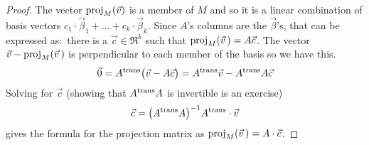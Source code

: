 \begin{proof}
The vector \( \proj{\vec{v}}{M} \) is a member of \( M \) and so it is a
linear combination of basis vectors
\( c_1\cdot\vec{\beta}_1+\dots+c_k\cdot\vec{\beta}_k \).
Since $A$'s columns are the $\vec{\beta}$'s, that can be expressed 
as:~there is a \( \vec{c}\in\Re^k \) such that
\( \proj{\vec{v}\,}{M}=A\vec{c} \).
The vector \( \vec{v}-\proj{\vec{v}\,}{M} \) is perpendicular to each member
of the basis so we have this.
\begin{equation*}
  \zero
  =\trans{A}\bigl( \vec{v}-A\vec{c} \bigr) 
  =\trans{A}\vec{v}-\trans{A}A\vec{c}
\end{equation*}
Solving for \( \vec{c} \) (showing that \( \trans{A}A \) is invertible is an
exercise)
\begin{equation*}
  \vec{c}=\bigl( \trans{A}A\bigr)^{-1}\trans{A}\cdot\vec{v}
\end{equation*}
gives the formula for the projection matrix as 
$\proj{\vec{v}\,}{M}=A\cdot\vec{c}$.
\end{proof}

